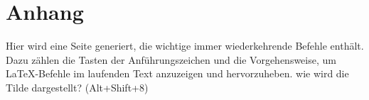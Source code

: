 \chapter{Anhang}
\label{cha:anhang}
Hier wird eine Seite generiert, die wichtige immer wiederkehrende Befehle enthält. Dazu zählen die Tasten der Anführungszeichen und die Vorgehensweise, um LaTeX-Befehle im laufenden Text anzuzeigen und hervorzuheben. wie wird die Tilde dargestellt? (Alt+Shift+8)